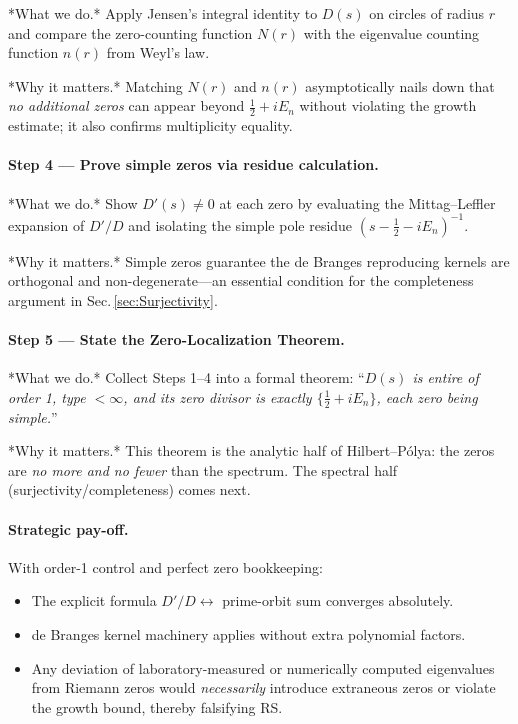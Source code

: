 \documentclass[11pt]{article}
\begin{document}
*What we do.*  
Apply Jensen’s integral identity to $D(s)$ on circles of radius $r$ and
compare the zero-counting function $N(r)$ with the eigenvalue counting
function $n(r)$ from Weyl’s law.

*Why it matters.*  
Matching $N(r)$ and $n(r)$ asymptotically nails down that \emph{no
additional zeros} can appear beyond $\tfrac12+iE_n$ without violating
the growth estimate; it also confirms multiplicity equality.

\vspace{0.4em}
\paragraph{Step 4 — Prove simple zeros via residue calculation.}

*What we do.*  
Show $D'(s)\neq0$ at each zero by evaluating the
Mittag–Leffler expansion of $D'/D$ and isolating the simple pole
residue $(s-\tfrac12-iE_n)^{-1}$.

*Why it matters.*  
Simple zeros guarantee the de Branges reproducing kernels are
orthogonal and non-degenerate—an essential condition for the
completeness argument in Sec.\,\ref{sec:Surjectivity}.

\vspace{0.4em}
\paragraph{Step 5 — State the Zero-Localization Theorem.}

*What we do.*  
Collect Steps 1–4 into a formal theorem:  
“\emph{$D(s)$ is entire of order 1, type $<\!\infty$, and its zero
divisor is exactly $\{\tfrac12+iE_n\}$, each zero being simple.}”

*Why it matters.*  
This theorem is the analytic half of Hilbert–Pólya: the zeros are
\emph{no more and no fewer} than the spectrum.  The spectral half
(surjectivity/completeness) comes next.

\vspace{0.4em}
\paragraph{Strategic pay-off.}
With order-1 control and perfect zero bookkeeping:
\begin{itemize}
\item The explicit formula $D'/D\leftrightarrow$ prime-orbit sum
      converges absolutely.
\item de Branges kernel machinery applies without extra polynomial
      factors.
\item Any deviation of laboratory-measured or numerically computed
      eigenvalues from Riemann zeros would \emph{necessarily} introduce
      extraneous zeros or violate the growth bound, thereby falsifying
      RS.
\end{itemize}
\end{document}
